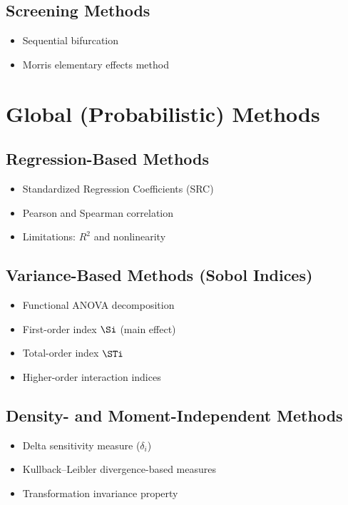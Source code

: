 \documentclass[../proposal]{subfiles}
\begin{document}
  \subsection{Screening Methods}
  \begin{itemize}
    \item Sequential bifurcation
    \item Morris elementary effects method
  \end{itemize}

\section{Global (Probabilistic) Methods}

  \subsection{Regression-Based Methods}
  \begin{itemize}
    \item Standardized Regression Coefficients (SRC)
    \item Pearson and Spearman correlation
    \item Limitations: $R^2$ and nonlinearity
  \end{itemize}

  \subsection{Variance-Based Methods (Sobol Indices)}
  \begin{itemize}
    \item Functional ANOVA decomposition
    \item First-order index $\Si$ (main effect)
    \item Total-order index $\STi$
    \item Higher-order interaction indices
  \end{itemize}

  \subsection{Density- and Moment-Independent Methods}
  \begin{itemize}
    \item Delta sensitivity measure ($\delta_i$)
    \item Kullback--Leibler divergence-based measures
    \item Transformation invariance property
  \end{itemize}
\end{document}
